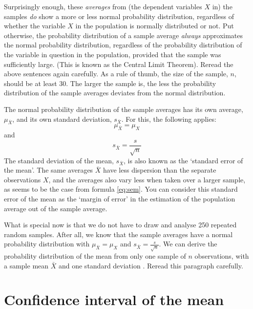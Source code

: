 \documentclass[
]{book}
\begin{document}
Surprisingly enough, these \emph{averages} from (the dependent variables
\(X\) in) the samples \emph{do} show a more or less normal probability distribution,
regardless of whether the variable \(X\) in the population is normally distributed or
not. Put otherwise, the probability distribution of a sample average \emph{always}
approximates the normal probability distribution, regardless of the probability
distribution of the variable in question in the population, provided that the sample
was sufficiently large. (This is known as the Central Limit Theorem). Reread the
above sentences again carefully. As a rule of thumb, the size of the sample, \(n\),
should be at least 30. The larger the sample is, the less the probability
distribution of the sample averages deviates from the normal distribution.

The normal probability distribution of the sample averages has its own average,
\(\mu_{\bar{X}}\), and its own standard deviation,
\(s_{\bar{X}}\). For this, the following applies:
\begin{equation}
    \mu_{\bar{X}} = \mu_X
    \label{eq:meanofmean}
\end{equation}
and
\begin{equation}
    s_{\bar{X}} = \frac{s}{\sqrt{n}}
    \label{eq:sem}
\end{equation}
The standard deviation of the
mean, \(s_{\bar{X}}\), is also known as the `standard error of
the mean'. The same averages \(\bar{X}\) have less dispersion than the separate
observations \(X\), and the averages also vary less when taken over a larger
sample, as seems to be the case from formula \eqref{eq:sem}. You can consider this
standard error of the mean as the `margin of error' in the estimation
of the population average out of the sample average.

What is special now is that we do not have to draw and analyse 250 repeated
random samples. After all, we know that the sample averages have a normal
probability distribution with
\(\mu_{\bar{X}} = \mu_X\) and \(s_{\bar{X}} = \frac{s}{\sqrt{n}}\). We can
derive the probability distribution of the mean from only one sample of
\(n\) observations, with a sample mean \(\bar{X}\) and one standard
deviation \citep{Cumm12}. Reread this paragraph carefully.

\section{Confidence interval of the mean}\label{sec:confidenceinterval-mean}
\end{document}
